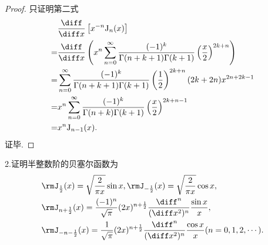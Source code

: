 \begin{proof}只证明第二式
\[\begin{split}
&\frac{\diff}{\diff x}\left[x^{-n}\mathrm{J}_n(x)\right]\\
=&\frac{\diff}{\diff x}\left(x^n\sum_{n=0}^{\infty}\frac{(-1)^k}{\Gamma(n+k+1)\Gamma(k+1)}\left(\frac{x}{2}\right)^{2k+n}\right)\\
=&\sum_{n=0}^{\infty}\frac{(-1)^k}{\Gamma(n+k+1)\Gamma(k+1)}\left(\frac{1}{2}\right)^{2k+n}(2k+2n)x^{2n+2k-1}\\
=&x^n\sum_{n=0}^{\infty}\frac{(-1)^k}{\Gamma(n+k)\Gamma(k+1)}\left(\frac{x}{2}\right)^{2k+n-1}\\
=&x^n\mathrm{J}_{n-1}(x).
\end{split}\]
证毕.
\end{proof}


2.证明半整数阶的贝塞尔函数为
\[\begin{split}
&\rmJ_{\frac{1}{2}}(x)=\sqrt{\frac{2}{\pi x}}\sin x,\rmJ_{-\frac{1}{2}}(x)=\sqrt{\frac{2}{\pi x}}\cos x,\\
&\rmJ_{n+\frac{1}{2}}(x)=\frac{(-1)^n}{\sqrt{\pi}}(2x)^{n+\frac{1}{2}}\frac{\diff^n}{(\diff x^2)^n}\frac{\sin x}{x},\\
&\rmJ_{-n-\frac{1}{2}}(x)=\frac{1}{\sqrt{\pi}}(2x)^{n+\frac{1}{2}}\frac{\diff^n}{(\diff x^2)^n}\frac{\cos x}{x}(n=0,1,2,\cdots).
\end{split}\]

